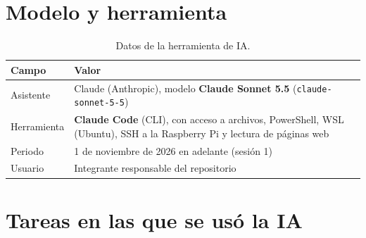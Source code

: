 \documentclass[12pt,a4paper]{article}
\begin{document}

\tableofcontents
\newpage

\section{Modelo y herramienta}

\begin{table}[H]
\centering
\small
\begin{tabular}{@{}p{3.4cm} p{11.6cm}@{}}
\toprule
\textbf{Campo} & \textbf{Valor} \\
\midrule
Asistente & Claude (Anthropic), modelo \textbf{Claude Sonnet 5.5} (\texttt{claude-sonnet-5-5}) \\
Herramienta & \textbf{Claude Code} (CLI), con acceso a archivos, PowerShell, WSL (Ubuntu), SSH a la Raspberry Pi y lectura de páginas web \\
Periodo & 1 de noviembre de 2026 en adelante (sesión 1) \\
Usuario & Integrante responsable del repositorio \\
\bottomrule
\end{tabular}
\caption{Datos de la herramienta de IA.}
\end{table}

\section{Tareas en las que se usó la IA}
\end{document}

